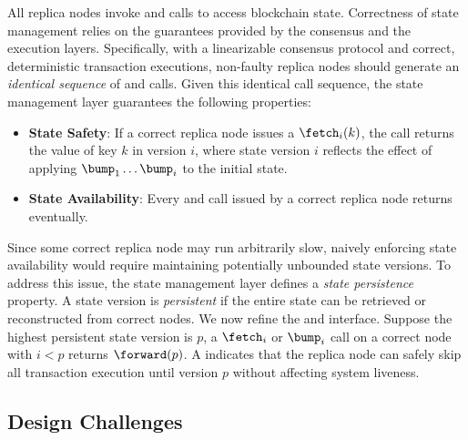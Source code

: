 All replica nodes invoke \fetch and \bump calls to access blockchain state.
Correctness of state management relies on the guarantees provided by the consensus and the execution layers.
Specifically, with a linearizable consensus protocol and correct, deterministic transaction executions, non-faulty replica nodes should generate an \emph{identical sequence} of \fetch and \bump calls.
Given this identical call sequence, the state management layer guarantees the following properties:

\begin{itemize}
    \item \textbf{State Safety}: If a correct replica node issues a $\fetch_{i}(k)$, the call returns the value of key $k$ in version $i$, where state version $i$ reflects the effect of applying $\bump_{1} \dots \bump_{i}$ to the initial state.

    \item \textbf{State Availability}: Every \fetch and \bump call issued by a correct replica node returns eventually. 
\end{itemize}

Since some correct replica node may run arbitrarily slow, naively enforcing state availability would require maintaining potentially unbounded state versions.
To address this issue, the state management layer defines a \emph{state persistence} property.
A state version is \emph{persistent} if the entire state can be retrieved or reconstructed from correct nodes.
We now refine the \fetch and \bump interface.
Suppose the highest persistent state version is $p$, a $\fetch_{i}$ or $\bump_{i}$ call on a correct node with $i < p$ returns $\forward(p)$.
A \forward indicates that the replica node can safely skip all transaction execution until version $p$ without affecting system liveness.



\subsection{Design Challenges}
\label{sec:arch:challenges}

